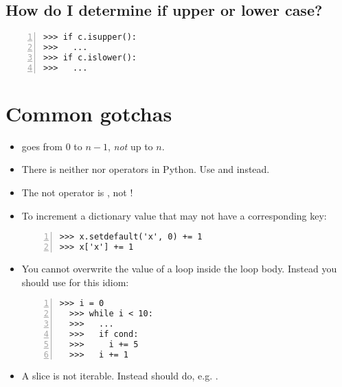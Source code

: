 \documentclass[12pt]{article}
\begin{document}
\subsection{How do I determine if upper or lower case?}
\begin{lstlisting}[numbers=left]
>>> if c.isupper():
>>>   ...
>>> if c.islower():
>>>   ...
\end{lstlisting}

\section{Common gotchas}
\begin{itemize}
\item {} goes from $0$ to $n-1$, \emph{not} up to $n$.
\item There is neither \python{++} nor \python{--} operators in Python. Use  and  instead.
\item The not operator is , not !
\item To increment a dictionary value that may not have a corresponding key:

\begin{lstlisting}[numbers=left]
>>> x.setdefault('x', 0) += 1
>>> x['x'] += 1
\end{lstlisting}
\item You cannot overwrite the value of a  loop inside the loop body. Instead you should use  for this idiom:

\begin{lstlisting}[numbers=left]
  >>> i = 0
  >>> while i < 10:
  >>>   ...
  >>>   if cond:
  >>>     i += 5
  >>>   i += 1
  \end{lstlisting}
\item A slice is not iterable. Instead should do, e.g. .

\end{itemize}

%
%
\end{document}
